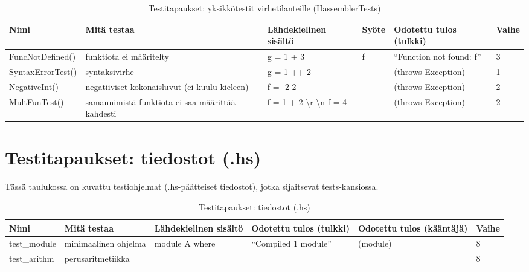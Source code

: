 \documentclass[11pt]{article} %
\begin{document}
\begin{table}[!htbp] %
\caption{Testitapaukset: yksikkötestit virhetilanteille (HassemblerTests)}
\begin{tabular}{|p{3cm}|p{}|p{3cm}|p{}|p{3cm}|p{}|}
\hline
\textbf{Nimi} & \textbf{Mitä testaa} & \textbf{Lähdekielinen sisältö} & \textbf{Syöte}  & \textbf{Odotettu tulos (tulkki)}  & \textbf{Vaihe} \\ \hline
 FuncNotDefined()  & funktiota ei määritelty   &  g = 1 + 3       &  f       &  ``Function not found: f''   &  3            \\ \hline
 SyntaxErrorTest()     & syntaksivirhe   &  g = 1 ++ 2    &           &   (throws Exception)   &    1     \\ \hline
NegativeInt()              & negatiiviset kokonaisluvut (ei kuulu kieleen)   &  f = -2-2   & &   (throws Exception)                                     &  2              \\ \hline       
MultFunTest()      & samannimistä funktiota ei saa määrittää kahdesti   & f = 1 + 2 \textbackslash r \textbackslash n f = 4   &        &  (throws Exception)    &    2                                               \\ \hline       
\end{tabular}
\end{table}

\pagebreak

\section{Testitapaukset: tiedostot (.hs)}

Tässä taulukossa on kuvattu testiohjelmat (.hs-päätteiset tiedostot), jotka sijaitsevat tests-kansiossa.

\begin{table}[!htbp] %
\caption{Testitapaukset: tiedostot (.hs)}
\begin{tabular}{|p{}|p{}|p{}|p{2cm}|p{3cm}|p{}|}
\hline
\textbf{Nimi} & \textbf{Mitä testaa} & \textbf{Lähdekielinen sisältö} & \textbf{Odotettu tulos (tulkki)} & \textbf{Odotettu tulos (kääntäjä)} & \textbf{Vaihe} \\ \hline
test\_module  &  minimaalinen ohjelma  & module A where &  ``Compiled 1 module''    &    (module)    & 8   \\ \hline
 test\_arithm     & perus\-aritmetiikka         &  &                                  &                                   &   8       \\ \hline


\end{tabular}
\end{table}
\end{document}
